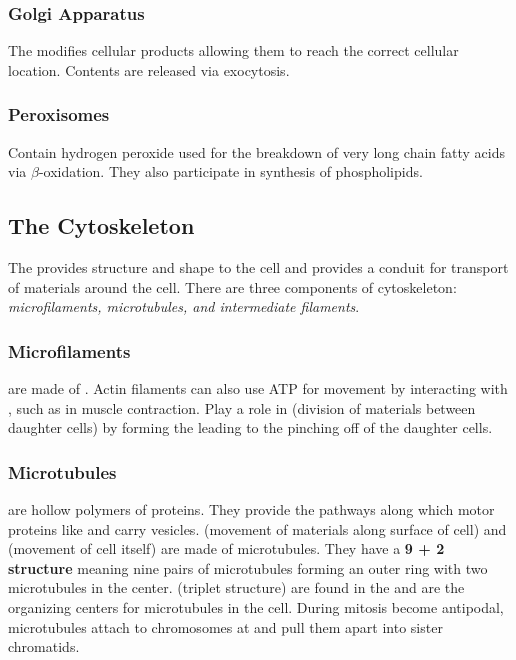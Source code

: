 \documentclass[../Bio_chemistryReview.tex]{subfiles}
\begin{document}
\subsubsection{Golgi Apparatus\supdag}

The  modifies cellular products allowing them to reach
the correct cellular location. Contents are released via exocytosis.

\subsubsection{Peroxisomes\supdag}

Contain hydrogen peroxide used for the breakdown of very long chain fatty acids
via $ \beta $-oxidation. They also participate in synthesis of phospholipids.

\subsection{The Cytoskeleton\supdag}

The  provides structure and shape to the cell and provides a
conduit for transport of materials around the cell. There are three components
of cytoskeleton: \emph{microfilaments, microtubules, and intermediate
filaments}.

\subsubsection{Microfilaments\supdag}

 are made of . Actin filaments can also use
ATP for movement by interacting with , such as in muscle
contraction. Play a role in  (division of materials between
daughter cells) by forming the  leading to the pinching
off of the daughter cells.

\subsubsection{Microtubules\supdag}

 are hollow polymers of  proteins. They
provide the pathways along which motor proteins like  and
 carry vesicles.  (movement of materials along
surface of cell) and  (movement of cell itself) are made of
microtubules. They have a \textbf{9 + 2 structure} meaning nine pairs of
microtubules forming an outer ring with two microtubules in the center.
 (triplet structure) are found in the  and
are the organizing centers for microtubules in the cell. During mitosis become
antipodal, microtubules attach to chromosomes at  and pull
them apart into sister chromatids.
\end{document}
